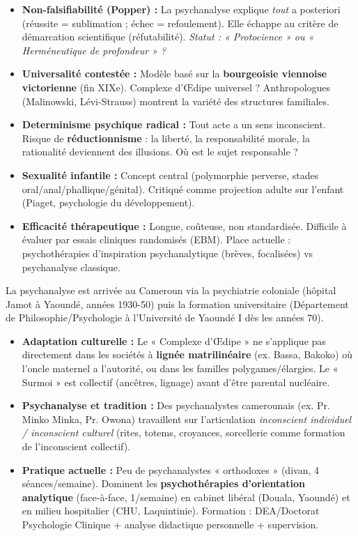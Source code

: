 \documentclass[11pt]{article}
\begin{document}
\begin{attention}
\begin{itemize}
    \item \textbf{Non-falsifiabilité (Popper) :} La psychanalyse explique \emph{tout} a posteriori (réussite = sublimation ; échec = refoulement). Elle échappe au critère de démarcation scientifique (réfutabilité). \emph{Statut : « Protocience » ou « Herméneutique de profondeur » ?}
    \item \textbf{Universalité contestée :} Modèle basé sur la \textbf{bourgeoisie viennoise victorienne} (fin XIXe). Complexe d'Œdipe universel ? Anthropologues (Malinowski, Lévi-Strauss) montrent la variété des structures familiales.
    \item \textbf{Determinisme psychique radical :} Tout acte a un sens inconscient. Risque de \textbf{réductionnisme} : la liberté, la responsabilité morale, la rationalité deviennent des illusions. Où est le sujet responsable ?
    \item \textbf{Sexualité infantile :} Concept central (polymorphie perverse, stades oral/anal/phallique/génital). Critiqué comme projection adulte sur l'enfant (Piaget, psychologie du développement).
    \item \textbf{Efficacité thérapeutique :} Longue, coûteuse, non standardisée. Difficile à évaluer par essais cliniques randomisés (EBM). Place actuelle : psychothérapies d'inspiration psychanalytique (brèves, focalisées) vs psychanalyse classique.
\end{itemize}
\end{attention}

\begin{savaistu}
La psychanalyse est arrivée au Cameroun via la psychiatrie coloniale (hôpital Jamot à Yaoundé, années 1930-50) puis la formation universitaire (Département de Philosophie/Psychologie à l'Université de Yaoundé I dès les années 70).
\begin{itemize}
    \item \textbf{Adaptation culturelle :} Le « Complexe d'Œdipe » ne s'applique pas directement dans les sociétés à \textbf{lignée matrilinéaire} (ex. Bassa, Bakoko) où l'oncle maternel a l'autorité, ou dans les familles polygames/élargies. Le « Surmoi » est collectif (ancêtres, lignage) avant d'être parental nucléaire.
    \item \textbf{Psychanalyse et tradition :} Des psychanalystes camerounais (ex. Pr. Minko Minka, Pr. Owona) travaillent sur l'articulation \emph{inconscient individuel / inconscient culturel} (rites, totems, croyances, sorcellerie comme formation de l'inconscient collectif).
    \item \textbf{Pratique actuelle :} Peu de psychanalystes « orthodoxes » (divan, 4 séances/semaine). Dominent les \textbf{psychothérapies d'orientation analytique} (face-à-face, 1/semaine) en cabinet libéral (Douala, Yaoundé) et en milieu hospitalier (CHU, Laquintinie). Formation : DEA/Doctorat Psychologie Clinique + analyse didactique personnelle + supervision.
\end{itemize}
\end{savaistu}
\end{document}
